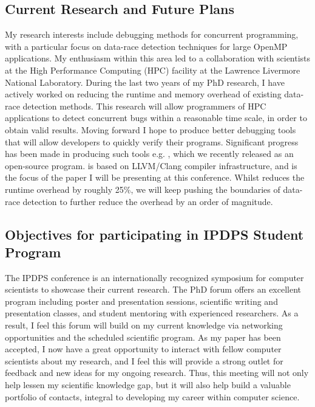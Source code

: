 \documentclass[svgnames,10pt]{article}
\begin{document}
\subsection{Current Research and Future Plans}
\vspace{-6pt}
My research interests include debugging methods for concurrent programming,
with a particular focus on data-race detection techniques for large OpenMP
applications.
%
My enthusiasm within this area led to a collaboration with scientists at the
High Performance Computing (HPC) facility at the Lawrence Livermore National
Laboratory.
%
During the last two years of my PhD research, I have actively worked on
reducing the runtime and memory overhead of existing data-race detection
methods.
%
This research will allow programmers of HPC applications to detect concurrent
bugs within a reasonable time scale, in order to obtain valid results.
%
Moving forward I hope to produce better debugging tools that will allow
developers to quickly verify their programs.
%
Significant progress has been made in producing such tools e.g. \archer, which we
recently released as an open-source program.
%
\archer is based on LLVM/Clang compiler infrastructure, and is the focus of
the paper I will be presenting at this conference.
%
Whilst \archer reduces the runtime overhead by roughly 25\%, we will keep
pushing the boundaries of data-race detection to further reduce the
overhead by an order of magnitude.

\vspace{-10pt}
\subsection{Objectives for participating in IPDPS Student Program}
\vspace{-6pt}
The IPDPS conference is an internationally recognized symposium for computer
scientists to showcase their current research.
%
The PhD forum offers an excellent program including poster and presentation
sessions, scientific writing and presentation classes, and student mentoring
with experienced researchers.
%
As a result, I feel this forum will build on my current knowledge via
networking opportunities and the scheduled scientific program.
%
As my paper has been accepted, I now have a great opportunity to interact with
fellow computer scientists about my research, and I feel this will provide a
strong outlet for feedback and new ideas for my ongoing research.
%
Thus, this meeting will not only help lessen my scientific knowledge gap, but
it will also help build a valuable portfolio of contacts, integral to
developing my career within computer science.
\end{document}
